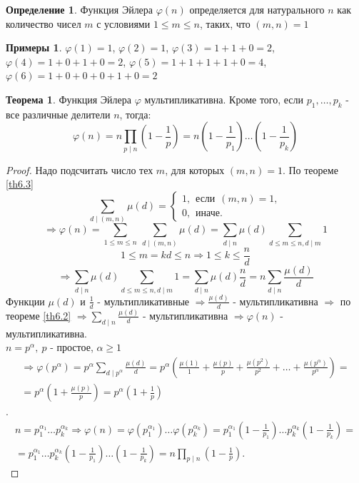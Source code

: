 \documentclass[a4paper, 12pt]{article}
\renewcommand{\phi}{\varphi}
\renewcommand{\div}{\mid}
\theoremstyle{definition}
\newtheorem{definition}{Определение}[section]
\newtheorem{theorem}{Теорема}[section]
\newtheorem*{examples}{Примеры}
\begin{document}
    \begin{definition}
        Функция Эйлера $\phi(n)$ определяется для натурального $n$ как количество чисел $m$ с условиями $1\leq m\leq n$, таких, что $(m,n)=1$
    \end{definition}
    \begin{examples}
        $\phi(1)=1$, $\phi(2)=1$, $\phi(3)=1+1+0=2$, $\phi(4)=1+0+1+0=2$, $\phi(5)=1+1+1+1+0=4$, $\phi(6)=1+0+0+0+1+0=2$
    \end{examples}
    \begin{theorem}
        Функция Эйлера $\phi$ мультипликативна. Кроме того, если $p_1,\dots,p_k$ - все различные делители $n$, тогда:
        \[\phi(n)=n\prod\limits_{p\div n}(1-\frac{1}{p})=n(1-\frac{1}{p_1})\dots(1-\frac{1}{p_k})\]
    \end{theorem} 
    \begin{proof}
        Надо подсчитать число тех $m$, для которых $(m,n)=1$. По теореме \ref{th6.3}
        \[\sum\limits_{d\div (m,n)}\mu(d)=\begin{cases}
            1, \hspace{5pt} \text{если} \hspace{5pt} (m,n)=1,\\
            0, \hspace{5pt} \text{иначе}.
        \end{cases}\]
        \[\Rightarrow \phi(n)=\sum\limits_{1\leq m\leq n}\ \sum\limits_{d\div (m,n)}\mu(d)=\sum_{d\div n}\mu(d)\sum\limits_{d\leq m\leq n, d\div m}1\]
        \[1\leq m=kd\leq n \Rightarrow 1\leq k\leq \frac{n}{d}\]
        \[\Rightarrow \sum_{d\div n}\mu(d)\sum\limits_{d\leq m\leq n, d\div m}1 =\sum\limits_{d\div n}\mu(d)\frac{n}{d}=n\sum\limits_{d\div n}\frac{\mu(d)}{d}\] Функции $\mu(d)$ и $\frac{1}{d}$ - мультипликативные $\Rightarrow \frac{\mu(d)}{d}$ - мультипликативна $\Rightarrow$ по теореме \ref{th6.2} $\Rightarrow \sum\limits_{d\div n}\frac{\mu(d)}{d}$ - мультипликативна $\Rightarrow \phi(n)$ - мультипликативна.\\
        $n=p^{\alpha},\ p$ - простое, $\alpha\geq 1$
        \begin{multline*}
            \Rightarrow \phi(p^{\alpha})=p^{\alpha}\sum\limits_{d \div p^{\alpha}}\frac{\mu(d)}{d}=p^{\alpha}(\frac{\mu(1)}{1}+\frac{\mu(p)}{p}+\frac{\mu(p^2)}{p^2}+\dots+\frac{\mu(p^{\alpha})}{p^{\alpha}})=\\
            =p^{\alpha}(1+\frac{\mu(p)}{p})=p^{\alpha}(1+\frac{1}{p})
        \end{multline*}.
        \begin{multline*}
            n=p_1^{\alpha_1}\dots p_k^{\alpha_k}\Rightarrow \phi(n)=\phi(p_1^{\alpha_1})\dots \phi(p_k^{\alpha_k})=p_1^{\alpha_1}(1-\frac{1}{p_1})\dots p_k^{\alpha_k}(1-\frac{1}{p_k})=\\
            =p_1^{\alpha_1}\dots p_k^{\alpha_k}(1-\frac{1}{p_1})\dots (1-\frac{1}{p_k})=n\prod\limits_{p\div n}(1-\frac{1}{p}).
        \end{multline*}
    \end{proof}
\end{document}
